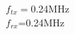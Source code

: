 \documentclass[preview]{standalone}
\begin{document}
\begin{center}
$f_{tx}=$0.24MHz\\$f_{rx}$=0.24MHz
\end{center}
\end{document}

